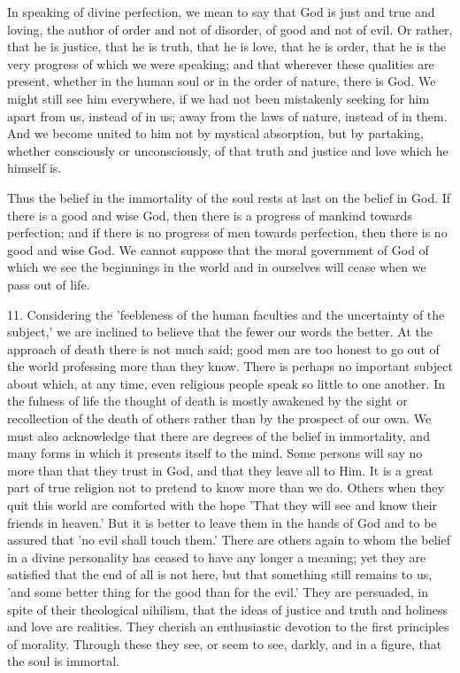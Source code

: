 \documentclass[11pt,letter]{article}
\begin{document}
\par  In speaking of divine perfection, we mean to say that God is just and true and loving, the author of order and not of disorder, of good and not of evil. Or rather, that he is justice, that he is truth, that he is love, that he is order, that he is the very progress of which we were speaking; and that wherever these qualities are present, whether in the human soul or in the order of nature, there is God. We might still see him everywhere, if we had not been mistakenly seeking for him apart from us, instead of in us; away from the laws of nature, instead of in them. And we become united to him not by mystical absorption, but by partaking, whether consciously or unconsciously, of that truth and justice and love which he himself is.

\par  Thus the belief in the immortality of the soul rests at last on the belief in God. If there is a good and wise God, then there is a progress of mankind towards perfection; and if there is no progress of men towards perfection, then there is no good and wise God. We cannot suppose that the moral government of God of which we see the beginnings in the world and in ourselves will cease when we pass out of life.

\par  11. Considering the 'feebleness of the human faculties and the uncertainty of the subject,' we are inclined to believe that the fewer our words the better. At the approach of death there is not much said; good men are too honest to go out of the world professing more than they know. There is perhaps no important subject about which, at any time, even religious people speak so little to one another. In the fulness of life the thought of death is mostly awakened by the sight or recollection of the death of others rather than by the prospect of our own. We must also acknowledge that there are degrees of the belief in immortality, and many forms in which it presents itself to the mind. Some persons will say no more than that they trust in God, and that they leave all to Him. It is a great part of true religion not to pretend to know more than we do. Others when they quit this world are comforted with the hope 'That they will see and know their friends in heaven.' But it is better to leave them in the hands of God and to be assured that 'no evil shall touch them.' There are others again to whom the belief in a divine personality has ceased to have any longer a meaning; yet they are satisfied that the end of all is not here, but that something still remains to us, 'and some better thing for the good than for the evil.' They are persuaded, in spite of their theological nihilism, that the ideas of justice and truth and holiness and love are realities. They cherish an enthusiastic devotion to the first principles of morality. Through these they see, or seem to see, darkly, and in a figure, that the soul is immortal.
\end{document}
